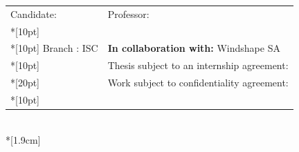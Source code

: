 \begin{spacing}{0.956}
\begin{center}
		{
			\begin{tabular*}{16cm}{p{7.59cm} p{7.58cm}}
				\small Candidate:					&	\small Professor:\\*[10pt]
				\small\textbf{\textsc{\Author}}		&	\small\textbf{\textsc{\Professor}}\\*[10pt]
				\footnotesize  Branch : ISC	&	\footnotesize  \textbf{In collaboration with:} Windshape SA \\*[10pt]
				\footnotesize  {} & \footnotesize  Thesis subject to an internship agreement: \Convention\\*[20pt]
				\footnotesize  {} & \footnotesize  Work subject to confidentiality agreement: \Confidentiel\\*[10pt]
			\end{tabular*}\\*[1.9cm]
		}

	\end{center}
\end{spacing}
